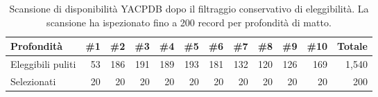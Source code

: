 \begin{table}[H]
\centering
\scriptsize
\caption{Scansione di disponibilità YACPDB dopo il filtraggio conservativo di eleggibilità.  La scansione ha ispezionato fino a 200 record per profondità di matto.}
\label{tab:yacpdb-availability}
\setlength{\tabcolsep}{3.5pt}
\begin{tabular}{@{}lrrrrrrrrrrr@{}}
\toprule
Profondità & \#1 & \#2 & \#3 & \#4 & \#5 & \#6 & \#7 & \#8 & \#9 & \#10 & Totale \\
\midrule
Eleggibili puliti & 53 & 186 & 191 & 189 & 193 & 181 & 132 & 120 & 126 & 169 & 1,540 \\
Selezionati & 20 & 20 & 20 & 20 & 20 & 20 & 20 & 20 & 20 & 20 & 200 \\
\bottomrule
\end{tabular}
\end{table}
